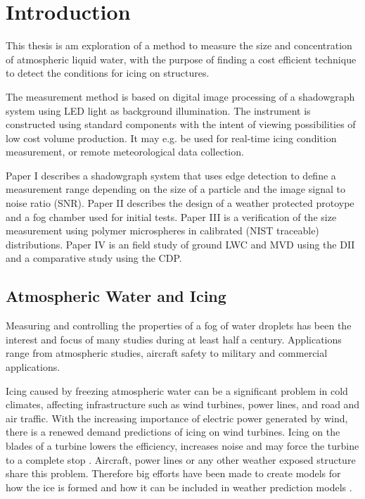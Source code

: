 

\chapter{Introduction}

This thesis is am exploration of a method to measure the size and concentration of atmospheric liquid water, with the purpose of finding a cost efficient technique to detect the conditions for icing on structures.

The measurement method is based on digital image processing of a shadowgraph system using LED light as background illumination. The instrument is constructed using standard components with the intent of viewing possibilities of low cost volume production. It may e.g. be used for real-time icing condition measurement, or remote meteorological data collection. 

Paper I describes a shadowgraph system that uses edge detection to define a measurement range depending on the size of a particle and the image signal to noise ratio (SNR). Paper II describes the design of a weather protected protoype and a fog chamber used for initial tests. Paper III is a verification of the size measurement using polymer microspheres in calibrated (NIST traceable) distributions. Paper IV is an field study of ground LWC and MVD using the DII and a comparative study using the CDP.

\section{Atmospheric Water and Icing}

Measuring and controlling the properties of a fog of water droplets has been the interest and focus of many studies during at least half a century. Applications range from atmospheric studies, aircraft safety to military and commercial applications. 

Icing caused by freezing atmospheric water can be a significant problem in cold climates, affecting infrastructure such as wind turbines, power lines, and road and air traffic. With the increasing importance of electric power generated by wind, there is a renewed demand predictions of icing on wind turbines. Icing on the blades of a turbine lowers the efficiency, increases noise and may force the turbine to a complete stop \cite{dalili2009,cost727,homo2012,jasin1998}. Aircraft, power lines or any other weather exposed structure share this problem. Therefore big efforts have been made to create models for how the ice is formed \cite{makk2000,makk2001,shin1992} and how it can be included in weather prediction models \cite{thomp2009,kring2011}.

